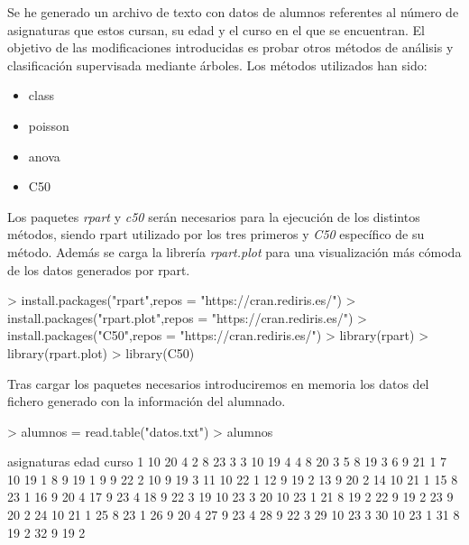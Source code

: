 \documentclass[a4paper]{article}
\begin{document}
Se he generado un archivo de texto con datos de alumnos referentes al número de asignaturas que estos cursan, su edad y el curso en el que se encuentran. El objetivo de las modificaciones introducidas es probar otros métodos de análisis y clasificación supervisada mediante árboles. Los métodos utilizados han sido:
\begin{itemize}
     \item class
     \item poisson
     \item anova
     \item C50
\end{itemize}


Los paquetes \textit{rpart} y \textit{c50} serán necesarios para la ejecución de los distintos métodos, siendo rpart utilizado por los tres primeros y \textit{C50} específico de su método. Además se carga la librería \textit{rpart.plot} para una visualización más cómoda de los datos generados por rpart.
\begin{Schunk}
\begin{Sinput}
> install.packages("rpart",repos = "https://cran.rediris.es/")
> install.packages("rpart.plot",repos = "https://cran.rediris.es/")
> install.packages("C50",repos = "https://cran.rediris.es/")
> library(rpart)
> library(rpart.plot)
> library(C50)
\end{Sinput}
\end{Schunk}

Tras cargar los paquetes necesarios introduciremos en memoria los datos del fichero generado con la información del alumnado.
\begin{Schunk}
\begin{Sinput}
> alumnos = read.table("datos.txt")
> alumnos
\end{Sinput}
\begin{Soutput}
   asignaturas edad curso
1           10   20     4
2            8   23     3
3           10   19     4
4            8   20     3
5            8   19     3
6            9   21     1
7           10   19     1
8            9   19     1
9            9   22     2
10           9   19     3
11          10   22     1
12           9   19     2
13           9   20     2
14          10   21     1
15           8   23     1
16           9   20     4
17           9   23     4
18           9   22     3
19          10   23     3
20          10   23     1
21           8   19     2
22           9   19     2
23           9   20     2
24          10   21     1
25           8   23     1
26           9   20     4
27           9   23     4
28           9   22     3
29          10   23     3
30          10   23     1
31           8   19     2
32           9   19     2
\end{Soutput}
\end{Schunk}
\end{document}
